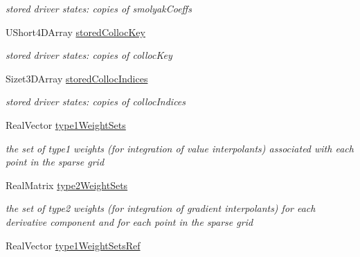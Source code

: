 \begin{DoxyCompactItemize}
\begin{DoxyCompactList}\small\item\em stored driver states\+: copies of smolyak\+Coeffs \end{DoxyCompactList}\item 
U\+Short4\+D\+Array \hyperlink{classPecos_1_1CombinedSparseGridDriver_a016b48727139af0e1bf8300e673692da}{stored\+Colloc\+Key}\label{classPecos_1_1CombinedSparseGridDriver_a016b48727139af0e1bf8300e673692da}

\begin{DoxyCompactList}\small\item\em stored driver states\+: copies of colloc\+Key \end{DoxyCompactList}\item 
Sizet3\+D\+Array \hyperlink{classPecos_1_1CombinedSparseGridDriver_a4d08e2c52e9b964b714c4a9e1759d2ce}{stored\+Colloc\+Indices}\label{classPecos_1_1CombinedSparseGridDriver_a4d08e2c52e9b964b714c4a9e1759d2ce}

\begin{DoxyCompactList}\small\item\em stored driver states\+: copies of colloc\+Indices \end{DoxyCompactList}\item 
Real\+Vector \hyperlink{classPecos_1_1CombinedSparseGridDriver_a5f380207cc4a07db88fe31b3a88b6029}{type1\+Weight\+Sets}\label{classPecos_1_1CombinedSparseGridDriver_a5f380207cc4a07db88fe31b3a88b6029}

\begin{DoxyCompactList}\small\item\em the set of type1 weights (for integration of value interpolants) associated with each point in the sparse grid \end{DoxyCompactList}\item 
Real\+Matrix \hyperlink{classPecos_1_1CombinedSparseGridDriver_a30698bb53a106db16591ea9d4cda6bf5}{type2\+Weight\+Sets}\label{classPecos_1_1CombinedSparseGridDriver_a30698bb53a106db16591ea9d4cda6bf5}

\begin{DoxyCompactList}\small\item\em the set of type2 weights (for integration of gradient interpolants) for each derivative component and for each point in the sparse grid \end{DoxyCompactList}\item 
Real\+Vector \hyperlink{classPecos_1_1CombinedSparseGridDriver_aac98bb355513889fb8f596211f05f4bd}{type1\+Weight\+Sets\+Ref}\label{classPecos_1_1CombinedSparseGridDriver_aac98bb355513889fb8f596211f05f4bd}


\end{DoxyCompactItemize}
